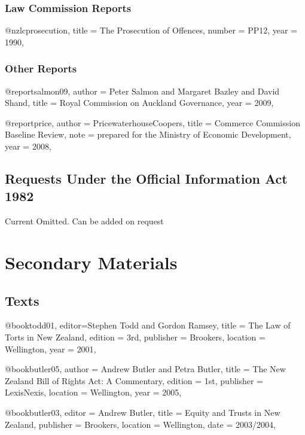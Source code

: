 \documentclass{book}
\begin{document}
\subsection{Law Commission Reports}
\begin{bib}
@nzlc{prosecution,
title = {The Prosecution of Offences},
number = {PP12},
year = {1990},
}
\end{bib}

\subsection{Other Reports}
\begin{bib}
@report{salmon09,
author = {Peter Salmon and Margaret Bazley and David Shand},
title  = {Royal Commission on Auckland Governance},
year = {2009},
}
\end{bib}
\begin{bib}
@report{price,
author = {PricewaterhouseCoopers},
title = {Commerce Commission Baseline Review},
note = {prepared for the Ministry of Economic Development},
year = {2008},
}
\end{bib}

\section{Requests Under the Official Information Act 1982}

Current Omitted. Can be added on request

\chapter{Secondary Materials}

\section{Texts}
\begin{bib}
@book{todd01,
editor={Stephen Todd and Gordon Ramsey},
title = {The Law of Torts in New Zealand},
edition = {3rd},
publisher = {Brookers},
location = {Wellington},
year = {2001},
}
\end{bib}
\begin{bib}
@book{butler05,
author = {Andrew Butler and Petra Butler},
title = {The New Zealand Bill of Rights Act: A Commentary},
edition = {1st},
publisher = {LexisNexis},
location = {Wellington},
year = {2005},
}
\end{bib}
\begin{bib}
@book{butler03,
editor = {Andrew Butler},
title = {Equity and Trusts in New Zealand},
publisher = {Brookers},
location = {Wellington},
date = {2003/2004},
}
\end{bib}
\end{document}
